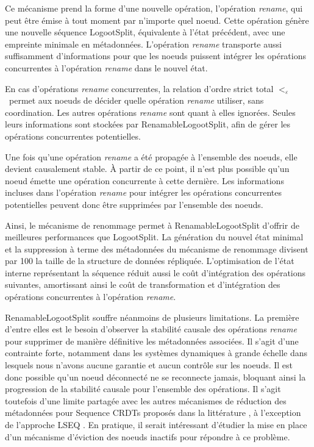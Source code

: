 \documentclass[12pt]{thesul}
\newcommand{\lepoch}{$<_{\varepsilon}$~}
\begin{document}
Ce mécanisme prend la forme d'une nouvelle opération, l'opération \emph{rename}, qui peut être émise à tout moment par n'importe quel noeud.
Cette opération génère une nouvelle séquence LogootSplit, équivalente à l'état précédent, avec une empreinte minimale en métadonnées.
L'opération \emph{rename} transporte aussi suffisamment d'informations pour que les noeuds puissent intégrer les opérations concurrentes à l'opération \emph{rename} dans le nouvel état.

En cas d'opérations \emph{rename} concurrentes, la relation d'ordre strict total \lepoch permet aux noeuds de décider quelle opération \emph{rename} utiliser, sans coordination.
Les autres opérations \emph{rename} sont quant à elles ignorées.
Seules leurs informations sont stockées par RenamableLogootSplit, afin de gérer les opérations concurrentes potentielles.

Une fois qu'une opération \emph{rename} a été propagée à l'ensemble des noeuds, elle devient causalement stable.
À partir de ce point, il n'est plus possible qu'un noeud émette une opération concurrente à cette dernière.
Les informations incluses dans l'opération \emph{rename} pour intégrer les opérations concurrentes potentielles peuvent donc être supprimées par l'ensemble des noeuds.

Ainsi, le mécanisme de renommage permet à RenamableLogootSplit d'offrir de meilleures performances que LogootSplit.
La génération du nouvel état minimal et la suppression à terme des métadonnées du mécanisme de renommage divisent par 100 la taille de la structure de données répliquée.
L'optimisation de l'état interne représentant la séquence réduit aussi le coût d'intégration des opérations suivantes, amortissant ainsi le coût de transformation et d'intégration des opérations concurrentes à l'opération \emph{rename}.

RenamableLogootSplit souffre néanmoins de plusieurs limitations.
La première d'entre elles est le besoin d'observer la stabilité causale des opérations \emph{rename} pour supprimer de manière définitive les métadonnées associées.
Il s'agit d'une contrainte forte, notamment dans les systèmes dynamiques à grande échelle dans lesquels nous n'avons aucune garantie et aucun contrôle sur les noeuds.
Il est donc possible qu'un noeud déconnecté ne se reconnecte jamais, bloquant ainsi la progression de la stabilité causale pour l'ensemble des opérations.
Il s'agit toutefois d'une limite partagée avec les autres mécanismes de réduction des métadonnées pour Sequence \acp{CRDT} proposés dans la littérature \cite{ROH2011354, zawirski:hal-01248197}, à l'exception de l'approche LSEQ \cite{lseq2017}.
En pratique, il serait intéressant d'étudier la mise en place d'un mécanisme d'éviction des noeuds inactifs pour répondre à ce problème.
\end{document}
